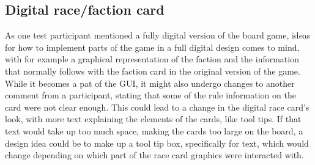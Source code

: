 \subsection{Digital race/faction card}
As one test participant mentioned a fully digital version of the board game, ideas for how to implement parts of the game in a full digital design comes to mind, with for example a graphical representation of the faction and the information that normally follows with the faction card in the original version of the game. While it becomes a pat of the GUI, it might also undergo changes to another comment from a participant, stating that some of the rule information on the card were not clear enough. This could lead to a change in the digital race card's look, with more text explaining the elements of the cards, like tool tips. If that text would take up too much space, making the cards too large on the board, a design idea could be to make up a tool tip box, specifically for text, which would change depending on which part of the race card graphics were interacted with.






